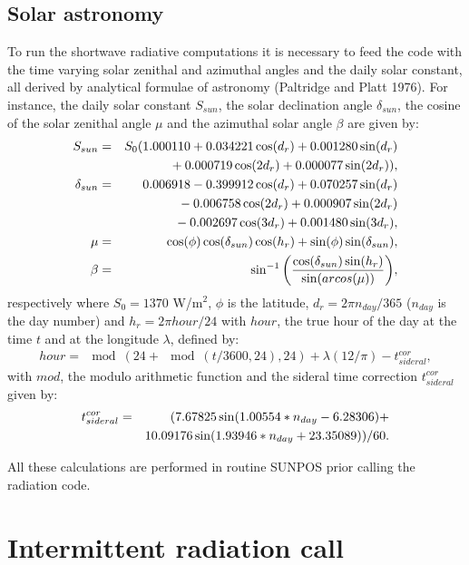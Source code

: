 \subsection{Solar astronomy}
To run the shortwave radiative computations it is necessary to feed the code
with the time varying solar zenithal and azimuthal angles and
the daily solar constant, all derived by analytical formulae of astronomy
(Paltridge and Platt 1976).
For instance, the daily solar constant $S_{sun}$, the solar declination angle
$\delta_{sun}$, the cosine of the solar zenithal angle $\mu$ and the azimuthal
solar angle $\beta$ are given by:
\begin{eqnarray}
S_{sun} &=& S_0(1.000110+0.034221\cos(d_r)+0.001280\sin(d_r) \cr
        & &              \mbox{} +0.000719\cos(2d_r)+0.000077\sin(2d_r)), \\
\delta_{sun} &=& 0.006918-0.399912 \cos(d_r)+0.070257 \sin(d_r) \cr
             & &          \mbox{} -0.006758 \cos(2d_r)+0.000907 \sin(2d_r) \cr
             & &          \mbox{} -0.002697\cos(3d_r)+0.001480\sin(3d_r), \\
\mu &=& \cos(\phi)\cos(\delta_{sun})\cos(h_r)+\sin(\phi)\sin(\delta_{sun}), \\
\beta &=& \sin^{-1}\displaystyle{\biggl(
        \displaystyle{\cos(\delta_{sun}) \sin(h_r) \over \sin(arcos(\mu))}
                                \biggr)},
\end{eqnarray}
respectively where $S_0=1370$ W/m$^2$, $\phi$ is the latitude,
$d_r=2\pi n_{day}/365$ ($n_{day}$ is the day number) and
$h_r=2\pi {hour}/24$ with ${hour}$, the true hour of the day at the time $t$
and at the longitude $\lambda$, defined by:
\begin{eqnarray}
{hour} = \mod(24+\mod(t/3600,24),24) + \lambda (12/\pi) - t_{sideral}^{cor},
\end{eqnarray}
with $mod$, the modulo arithmetic function and the sideral time correction
$t_{sideral}^{cor}$ given by:
\begin{eqnarray}
t_{sideral}^{cor} &=& (7.67825 \sin(1.00554*n_{day}-6.28306) + \cr
        & &              \mbox{} 10.09176 \sin(1.93946*n_{day}+23.35089))/60.
\end{eqnarray}

\noindent All these calculations are performed in routine SUNPOS prior calling
the radiation code.

\section{Intermittent radiation call}

